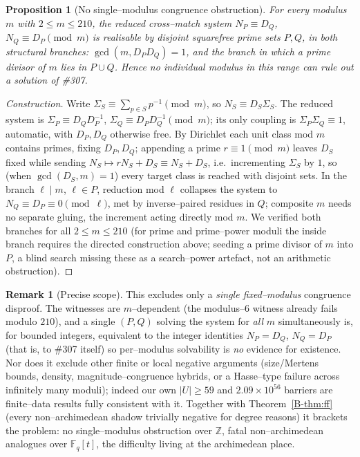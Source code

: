 \documentclass[11pt]{article}
\newtheorem{proposition}[theorem]{Proposition}
\theoremstyle{definition}
\newtheorem{remark}[theorem]{Remark}
\begin{document}
\begin{proposition}[No single--modulus congruence obstruction]\label{prop:nolocal}
For every modulus $m$ with $2\le m\le210$, the reduced cross--match system $N_P\equiv D_Q$,
$N_Q\equiv D_P\pmod m$ is realisable by disjoint squarefree prime sets $P,Q$, in both structural
branches: $\gcd(m,D_PD_Q)=1$, and the branch in which a prime divisor of $m$ lies in $P\cup Q$. Hence
no individual modulus in this range can rule out a solution of \#307.
\end{proposition}
\begin{proof}[Construction]
Write $\Sigma_S\equiv\sum_{p\in S}p^{-1}\pmod m$, so $N_S\equiv D_S\Sigma_S$. The reduced system is
$\Sigma_P\equiv D_Q D_P^{-1}$, $\Sigma_Q\equiv D_P D_Q^{-1}\pmod m$; its only coupling is
$\Sigma_P\Sigma_Q\equiv1$, automatic, with $D_P,D_Q$ otherwise free. By Dirichlet each unit class mod
$m$ contains primes, fixing $D_P,D_Q$; appending a prime $r\equiv1\pmod m$ leaves $D_S$ fixed while
sending $N_S\mapsto rN_S+D_S\equiv N_S+D_S$, i.e.\ incrementing $\Sigma_S$ by $1$, so (when
$\gcd(D_S,m)=1$) every target class is reached with disjoint sets. In the branch $\ell\mid m$,
$\ell\in P$, reduction mod $\ell$ collapses the system to $N_Q\equiv D_P\equiv0\pmod\ell$, met by
inverse--paired residues in $Q$; composite $m$ needs no separate gluing, the increment acting directly
mod $m$. We verified both branches for all $2\le m\le210$ (for prime and prime--power moduli the
inside branch requires the directed construction above; seeding a prime divisor of $m$ into $P$,
a blind search missing these as a search--power artefact, not an arithmetic obstruction).
\end{proof}
\begin{remark}[Precise scope]
This excludes only a \emph{single fixed--modulus} congruence disproof. The witnesses are
$m$--dependent (the modulus--$6$ witness already fails modulo $210$), and a single $(P,Q)$ solving the
system for \emph{all} $m$ simultaneously is, for bounded integers, equivalent to the integer identities
$N_P=D_Q$, $N_Q=D_P$ (that is, to \#307 itself) so per--modulus solvability is \emph{no} evidence
for existence. Nor does it exclude other finite or local negative arguments (size/Mertens bounds,
density, magnitude--congruence hybrids, or a Hasse--type failure across infinitely many moduli);
indeed our own $|U|\ge59$ and $2.09\times10^{56}$ barriers are finite--data results fully consistent
with it. Together with Theorem~\ref{B-thm:ff} (every non--archimedean shadow trivially negative for
degree reasons) it brackets the problem: no single--modulus obstruction over $\mathbb{Z}$, fatal
non--archimedean analogues over $\mathbb{F}_q[t]$, the difficulty living at the archimedean place.
\end{remark}
\end{document}

